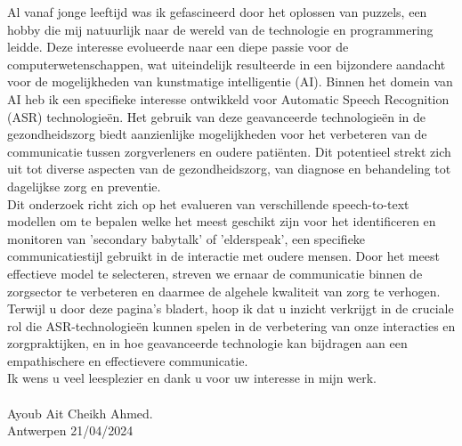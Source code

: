 Al vanaf jonge leeftijd was ik gefascineerd door het oplossen van puzzels, een hobby die mij natuurlijk naar de wereld van de technologie en programmering leidde. Deze interesse evolueerde naar een diepe passie voor de computerwetenschappen, wat uiteindelijk resulteerde in een bijzondere aandacht voor de mogelijkheden van kunstmatige intelligentie (AI). Binnen het domein van AI heb ik een specifieke interesse ontwikkeld voor Automatic Speech Recognition (ASR) technologieën. Het gebruik van deze geavanceerde technologieën in de gezondheidszorg biedt aanzienlijke mogelijkheden voor het verbeteren van de communicatie tussen zorgverleners en oudere patiënten. Dit potentieel strekt zich uit tot diverse aspecten van de gezondheidszorg, van diagnose en behandeling tot dagelijkse zorg en preventie.
\\
Dit onderzoek richt zich op het evalueren van verschillende speech-to-text modellen om te bepalen welke het meest geschikt zijn voor het identificeren en monitoren van 'secondary babytalk' of 'elderspeak', een specifieke communicatiestijl gebruikt in de interactie met oudere mensen. Door het meest effectieve model te selecteren, streven we ernaar de communicatie binnen de zorgsector te verbeteren en daarmee de algehele kwaliteit van zorg te verhogen.
\\
Terwijl u door deze pagina's bladert, hoop ik dat u inzicht verkrijgt in de cruciale rol die ASR-technologieën kunnen spelen in de verbetering van onze interacties en zorgpraktijken, en in hoe geavanceerde technologie kan bijdragen aan een empathischere en effectievere communicatie.
\\
Ik wens u veel leesplezier en dank u voor uw interesse in mijn werk.
\\
\\
Ayoub Ait Cheikh Ahmed.
\\
Antwerpen 21/04/2024